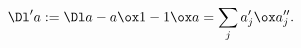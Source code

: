 \begin{equation}
\Dl'a := \Dl a - a \ox 1 - 1 \ox a = \sum_j a'_j \ox  a''_j.
\label{eq:gr-coprod-trunc}%
\end{equation}

